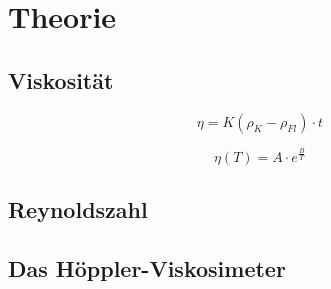 \section{Theorie}
\label{sec:Theorie}

\subsection{Viskosität}
\label{sec:Viskosität}

\begin{equation}
    \eta = K(\rho _{K}-\rho _{Fl})\cdot t
    \label{eqn:Viskosität}
\end{equation}

\begin{equation}
    \eta (T)=A\cdot e^{\frac{B}{T}}
    \label{eqn:Andradesche Gleichung}
\end{equation}

\cite{v107}

\subsection{Reynoldszahl}
\label{sec:Reynoldszahl}

\subsection{Das Höppler-Viskosimeter}
\label{sec:Das Höppler-Viskosimeter}